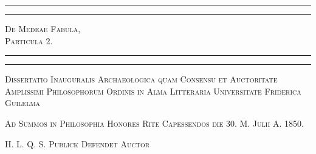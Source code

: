 \documentclass[a4paper, 11pt, oneside, polutonikogreek, german]{article}
\begin{document}
\renewcommand\thefootnote{{\Fontlukas\bfseries\color{White}{\arabic{footnote}}}}
\let\oldfootnote\footnote
    \renewcommand{\footnote}[1]{\oldfootnote{{\normalsize\Fontlukas\bfseries\color{White}#1}}}
\begin{titlepage} %
	\centering %

	
	\rule{\textwidth}{1.6pt}\vspace*{-\baselineskip}\vspace*{2pt} %
	\rule{\textwidth}{0.4pt} %
	
	\vspace{1\baselineskip} %
	
	{\scshape\Huge De Medeae Fabula,\\ \Large Particula 2.}
	
	\vspace{1\baselineskip} %

	\rule{\textwidth}{0.4pt}\vspace*{-\baselineskip}\vspace{3.2pt} %
	\rule{\textwidth}{1.6pt} %
	
	\vspace{1\baselineskip} %
	
	
	{\scshape \large Dissertatio Inauguralis Archaeologica quam Consensu et Auctoritate Amplissimi Philosophorum Ordinis in Alma Litteraria Universitate Friderica Guilelma}
 
        \vspace{0.5\baselineskip}
        
        {\scshape \small Ad Summos in Philosophia Honores Rite Capessendos die 30. M. Julii A. 1850.}

        \vspace{0.5\baselineskip}
        
        {\scshape \scriptsize H. L. Q. S. Publick Defendet Auctor} %
	
	\vspace*{1\baselineskip} %
	

\end{titlepage}
\end{document}
